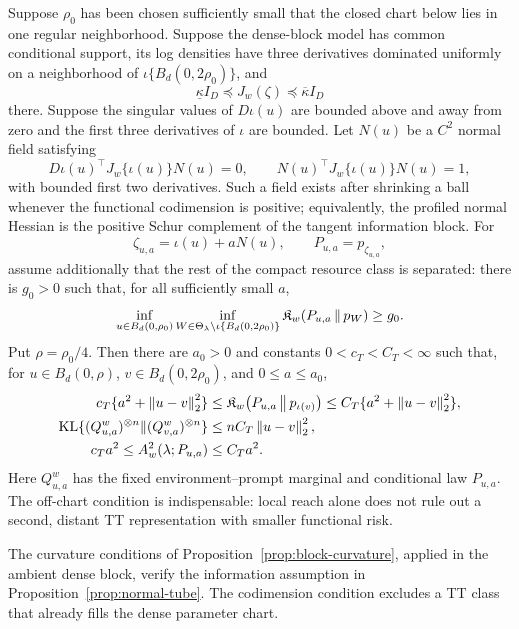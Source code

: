 \begin{proposition}
\label{prop:normal-tube}
Suppose \(\rho_0\) has been chosen sufficiently small that the closed chart
below lies in one regular neighborhood. Suppose the dense-block model has common conditional support, its log
densities have three derivatives dominated uniformly on a neighborhood of
\(\iota\{B_d(0,2\rho_0)\}\), and
\[
 \underline\kappa I_D\preceq J_w(\zeta)
 \preceq\overline\kappa I_D
\]
there.  Suppose the singular values of \(D\iota(u)\) are bounded above and
away from zero and the first three derivatives of \(\iota\) are bounded.
Let \(N(u)\) be a \(C^2\) normal field satisfying
\begin{equation}
 D\iota(u)^\top J_w\{\iota(u)\}N(u)=0,
 \qquad
 N(u)^\top J_w\{\iota(u)\}N(u)=1,
 \label{eq:fisher-normal}
\end{equation}
with bounded first two derivatives.  Such a field exists after shrinking a
ball whenever the functional codimension is positive; equivalently, the
profiled normal Hessian is the positive Schur complement of the tangent
information block.  For
\[
 \zeta_{u,a}=\iota(u)+aN(u),\qquad P_{u,a}=p_{\zeta_{u,a}},
\]
assume additionally that the rest of the compact resource class is separated:
there is \(g_0>0\) such that, for all sufficiently small \(a\),
\begin{equation}
 \inf_{u\in B_d(0,\rho_0)}
 \inf_{W\in\Theta_\lambda\setminus
 \iota\{B_d(0,2\rho_0)\}}
 \mathfrak K_w\!\left(P_{u,a}\,\middle\|\,p_W\right)\ge g_0.
 \label{eq:off-chart-gap}
\end{equation}
Put \(\rho=\rho_0/4\). Then there are \(a_0>0\) and constants
\(0<c_T<C_T<\infty\) such that, for
\(u\in B_d(0,\rho)\), \(v\in B_d(0,2\rho_0)\), and
\(0\le a\le a_0\),
\begin{align}
 c_T\{a^2+\left\lVert u-v\right\rVert_2^2\}
 &\le \mathfrak K_w\!\left(P_{u,a}\,\middle\|\,p_{\iota(v)}\right)
 \le C_T\{a^2+\left\lVert u-v\right\rVert_2^2\},
 \label{eq:tube-loss}\\
 \operatorname{KL}\{(Q_{u,a}^w)^{\otimes n}\|(Q_{v,a}^w)^{\otimes n}\}
 &\le nC_T\left\lVert u-v\right\rVert_2^2,
 \label{eq:tube-kl}\\
 c_Ta^2\le A_w^2(\lambda;P_{u,a})&\le C_Ta^2.
 \label{eq:tube-approx}
\end{align}
Here \(Q_{u,a}^w\) has the fixed environment--prompt marginal and conditional
law \(P_{u,a}\).  The off-chart condition is indispensable: local reach alone
does not rule out a second, distant TT representation with smaller functional
risk.
\end{proposition}

The curvature conditions of Proposition~\ref{prop:block-curvature}, applied in
the ambient dense block, verify the information assumption in
Proposition~\ref{prop:normal-tube}.  The codimension condition excludes a TT
class that already fills the dense parameter chart.

